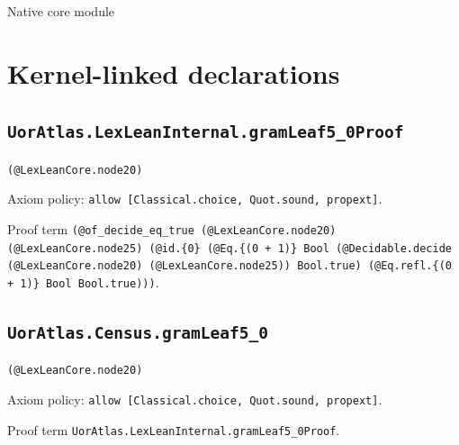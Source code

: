 \documentclass[11pt]{article}
\begin{document}
\begin{center}{\LARGE Native core module}\end{center}
\section*{Kernel-linked declarations}
\subsection*{\texttt{UorAtlas.LexLeanInternal.gramLeaf5\_0Proof}}
\noindent\texttt{(@LexLeanCore.node20)}\par
\noindent Axiom policy: \texttt{allow [Classical.choice, Quot.sound, propext]}.\par
\noindent Proof term \texttt{(@of\_decide\_eq\_true (@LexLeanCore.node20) (@LexLeanCore.node25) (@id.\{0\} (@Eq.\{(0 + 1)\} Bool (@Decidable.decide (@LexLeanCore.node20) (@LexLeanCore.node25)) Bool.true) (@Eq.refl.\{(0 + 1)\} Bool Bool.true)))}.\par
\subsection*{\texttt{UorAtlas.Census.gramLeaf5\_0}}
\noindent\texttt{(@LexLeanCore.node20)}\par
\noindent Axiom policy: \texttt{allow [Classical.choice, Quot.sound, propext]}.\par
\noindent Proof term \texttt{UorAtlas.LexLeanInternal.gramLeaf5\_0Proof}.\par
\end{document}
